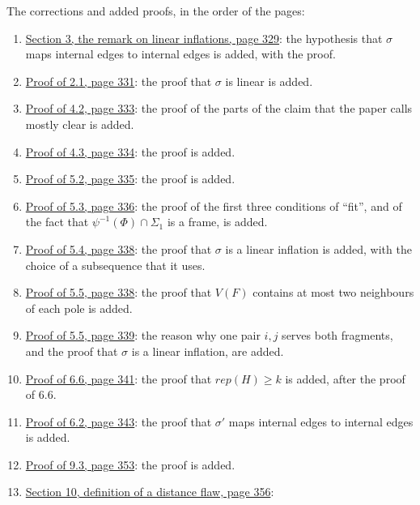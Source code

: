 The corrections and added proofs, in the order of the pages:
\begin{enumerate}\setlength{\itemsep}{1pt}
\item {}\hyperref[fix:3-linear]{Section 3, the remark on linear inflations, page 329}: the
hypothesis that $\sigma$ maps internal edges to internal edges is added, with the proof.
\item {}\hyperref[fix:2.1-linear-proof-added]{Proof of 2.1, page 331}: the proof that $\sigma$ is linear is
added.
\item {}\hyperref[fix:4.2-proof-added]{Proof of 4.2, page 333}: the proof of the parts of the claim
that the paper calls mostly clear is added.
\item {}\hyperref[fix:4.3-proof-added]{Proof of 4.3, page 334}: the proof is added.
\item {}\hyperref[fix:5.2-proof-added]{Proof of 5.2, page 335}: the proof is added.
\item {}\hyperref[fix:5.3-proof-added]{Proof of 5.3, page 336}: the proof of the first three
conditions of ``fit'', and of the fact that $\psi^{-1}(\Phi) \cap \Sigma_1$ is a frame, is added.
\item {}\hyperref[fix:5.4-proof-added]{Proof of 5.4, page 338}: the proof that $\sigma$ is a linear
inflation is added, with the choice of a subsequence that it uses.
\item {}\hyperref[fix:5.5-proof-added]{Proof of 5.5, page 338}: the proof that $V(F)$ contains at
most two neighbours of each pole is added.
\item {}\hyperref[fix:5.5-common-pair]{Proof of 5.5, page 339}: the reason why one pair $i, j$ serves
both fragments, and the proof that $\sigma$ is a linear inflation, are added.
\item {}\hyperref[fix:6.6-rep-proof-added]{Proof of 6.6, page 341}: the proof that $rep(H) \ge k$ is
added, after the proof of 6.6.
\item {}\hyperref[fix:6.2-internal]{Proof of 6.2, page 343}: the proof that $\sigma'$ maps internal
edges to internal edges is added.
\item {}\hyperref[fix:9.3-proof-added]{Proof of 9.3, page 353}: the proof is added.
\item {}\hyperref[fix:10-distance-flaw]{Section 10, definition of a distance flaw, page 356}:

\end{enumerate}
